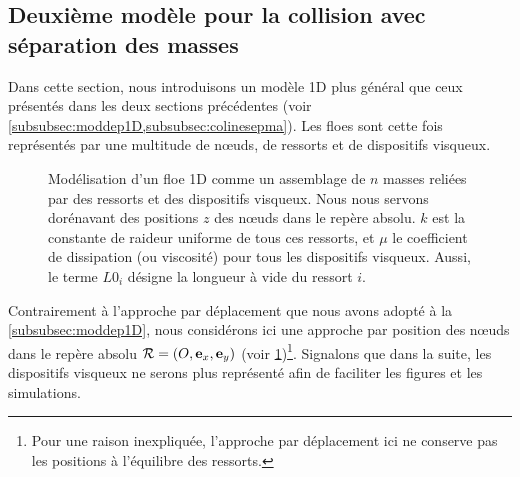 




\subsection{Deuxième modèle pour la collision avec séparation des masses}
\label{subsec:model1d2}



Dans cette section, nous introduisons un modèle 1D plus général que ceux présentés dans les deux sections précédentes (voir \cref{subsubsec:moddep1D,subsubsec:colinesepma}). Les floes sont cette fois représentés par une multitude de n\oe{}uds, de ressorts et de dispositifs visqueux. 
\begin{figure}[!h]
    \centering
    \caption{Modélisation d'un floe 1D comme un assemblage de $n$ masses reliées par des ressorts et des dispositifs visqueux. Nous nous servons dorénavant des positions $z$ des n\oe{}uds dans le repère absolu. $k$ est la constante de raideur uniforme de tous ces ressorts, et $\mu$ le coefficient de dissipation (ou viscosité) pour tous les dispositifs visqueux. Aussi, le terme $L0_i$ désigne la longueur à vide du ressort $i$.}
    \label{fig:dep1d4}
\end{figure}
Contrairement à l'approche par déplacement que nous avons adopté à la \cref{subsubsec:moddep1D}, nous considérons ici une approche par position des n\oe{}uds dans le repère absolu $\mathcal{R}= (O, \bm{\mathrm{e}}_x, \bm{\mathrm{e}}_y)$ (voir \cref{fig:dep1d4})\footnote{Pour une raison inexpliquée, l'approche par déplacement ici ne conserve pas les positions à l'équilibre des ressorts.}. Signalons que dans la suite, les dispositifs visqueux ne serons plus représenté afin de faciliter les figures et les simulations.  

